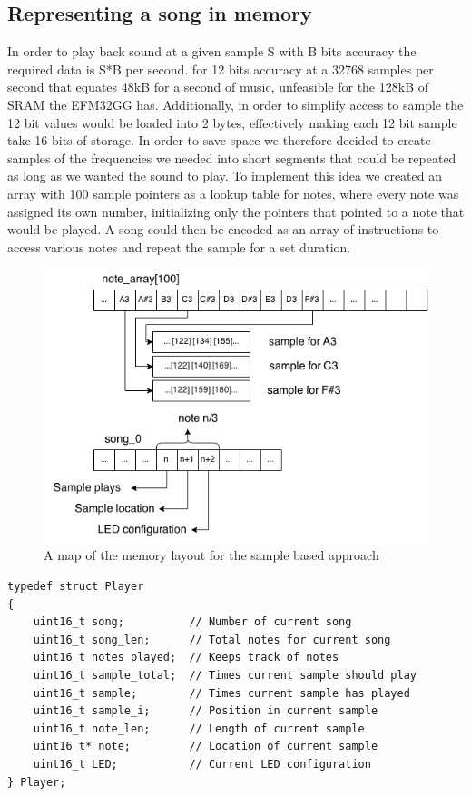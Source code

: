 \subsection{Representing a song in memory}
In order to play back sound at a given sample S with B bits accuracy the required data is S*B per second. for 12 bits accuracy at a 32768 samples per second that equates 48kB for a second of music, unfeasible for the 128kB of SRAM the EFM32GG has. Additionally, in order to simplify access to sample the 12 bit values would be loaded into 2 bytes, effectively making each 12 bit sample take 16 bits of storage. In order to save space we therefore decided to create samples of the frequencies we needed into short segments that could be repeated as long as we wanted the sound to play. To implement this idea we created an array with 100 sample pointers as a lookup table for notes, where every note was assigned its own number, initializing only the pointers that pointed to a note that would be played. A song could then be encoded as an array of instructions to access various notes and repeat the sample for a set duration.



\begin{figure}[ht]
  \centering
  \includegraphics[width=\textwidth]{images/sample_array_layout.png}
  \caption{A map of the memory layout for the sample based approach}\label{fig:array_layout}
\end{figure}

\begin{minipage}{\textwidth}
\begin{lstlisting}
typedef struct Player
{
	uint16_t song;			// Number of current song
	uint16_t song_len;		// Total notes for current song
	uint16_t notes_played;	// Keeps track of notes
	uint16_t sample_total;	// Times current sample should play	
	uint16_t sample;		// Times current sample has played
	uint16_t sample_i;		// Position in current sample 
	uint16_t note_len;		// Length of current sample
	uint16_t* note;			// Location of current sample
	uint16_t LED;			// Current LED configuration
} Player;
\end{lstlisting}
\end{minipage}

